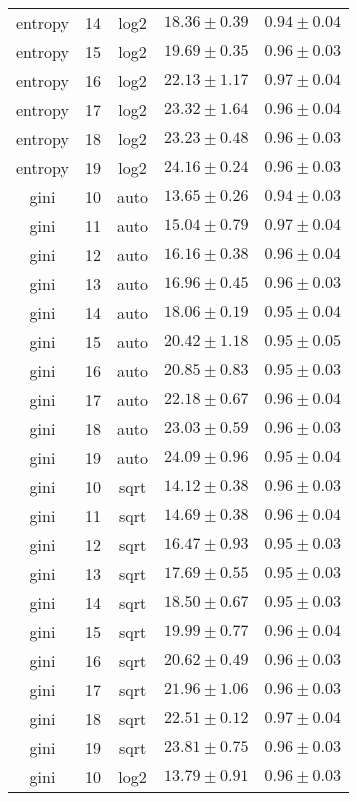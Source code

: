 \begin{tabular}{cccrr}
entropy & 14 & log2 & $18.36 \pm 0.39$ & $0.94 \pm 0.04$\\
entropy & 15 & log2 & $19.69 \pm 0.35$ & $0.96 \pm 0.03$\\
entropy & 16 & log2 & $22.13 \pm 1.17$ & $0.97 \pm 0.04$\\
entropy & 17 & log2 & $23.32 \pm 1.64$ & $0.96 \pm 0.04$\\
entropy & 18 & log2 & $23.23 \pm 0.48$ & $0.96 \pm 0.03$\\
entropy & 19 & log2 & $24.16 \pm 0.24$ & $0.96 \pm 0.03$\\
gini & 10 & auto & $13.65 \pm 0.26$ & $0.94 \pm 0.03$\\
gini & 11 & auto & $15.04 \pm 0.79$ & $0.97 \pm 0.04$\\
gini & 12 & auto & $16.16 \pm 0.38$ & $0.96 \pm 0.04$\\
gini & 13 & auto & $16.96 \pm 0.45$ & $0.96 \pm 0.03$\\
gini & 14 & auto & $18.06 \pm 0.19$ & $0.95 \pm 0.04$\\
gini & 15 & auto & $20.42 \pm 1.18$ & $0.95 \pm 0.05$\\
gini & 16 & auto & $20.85 \pm 0.83$ & $0.95 \pm 0.03$\\
gini & 17 & auto & $22.18 \pm 0.67$ & $0.96 \pm 0.04$\\
gini & 18 & auto & $23.03 \pm 0.59$ & $0.96 \pm 0.03$\\
gini & 19 & auto & $24.09 \pm 0.96$ & $0.95 \pm 0.04$\\
gini & 10 & sqrt & $14.12 \pm 0.38$ & $0.96 \pm 0.03$\\
gini & 11 & sqrt & $14.69 \pm 0.38$ & $0.96 \pm 0.04$\\
gini & 12 & sqrt & $16.47 \pm 0.93$ & $0.95 \pm 0.03$\\
gini & 13 & sqrt & $17.69 \pm 0.55$ & $0.95 \pm 0.03$\\
gini & 14 & sqrt & $18.50 \pm 0.67$ & $0.95 \pm 0.03$\\
gini & 15 & sqrt & $19.99 \pm 0.77$ & $0.96 \pm 0.04$\\
gini & 16 & sqrt & $20.62 \pm 0.49$ & $0.96 \pm 0.03$\\
gini & 17 & sqrt & $21.96 \pm 1.06$ & $0.96 \pm 0.03$\\
gini & 18 & sqrt & $22.51 \pm 0.12$ & $0.97 \pm 0.04$\\
gini & 19 & sqrt & $23.81 \pm 0.75$ & $0.96 \pm 0.03$\\
gini & 10 & log2 & $13.79 \pm 0.91$ & $0.96 \pm 0.03$\\

\end{tabular}
